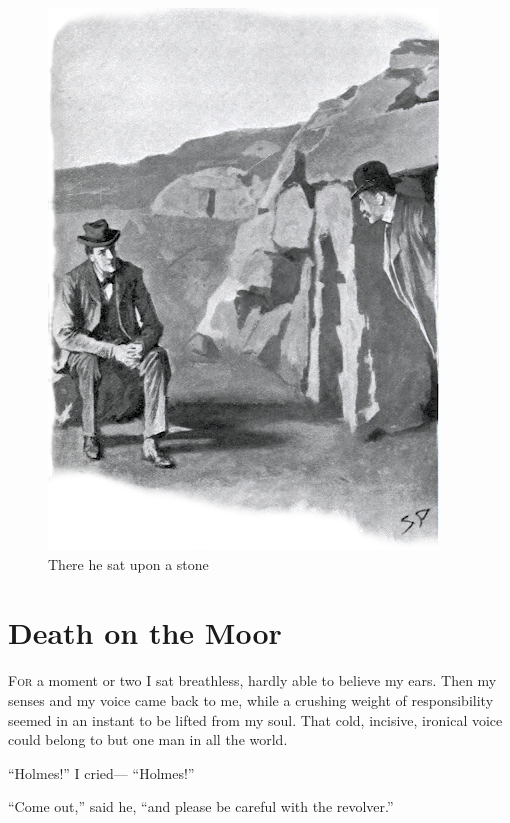 \documentclass[paper=a5,BCOR=7mm,twoside,DIV=calc,12pt,usegeometry,openany,chapterprefix,endperiod,headings=big]{scrbook} %
\begin{document}
\clearpage
\vfill
\begin{figure}[tbph]
\centering
\includegraphics[width=\linewidth]{12_therehesat}
\caption{There he sat upon a stone}
\end{figure}
\vfill
\thispagestyle{empty}
\clearpage

\chapter{Death on the Moor}
\lettrine[lines=1]{F}{or} a moment or two I sat breathless, hardly able to believe my ears. Then my senses and my voice came back to me, while a crushing weight of responsibility seemed in an instant to be lifted from my soul. That cold, incisive, ironical voice could belong to but one man in all the world.

\enquote{Holmes!} I cried--- \enquote{Holmes!}

\enquote{Come out,} said he, \enquote{and please be careful with the revolver.}
\end{document}
